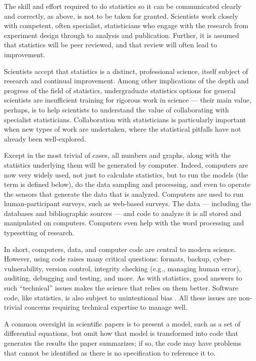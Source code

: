\documentclass{comjnl}
\begin{document}
The skill and effort required to do statistics so it can be communicated clearly and correctly, as above, is not to be taken for granted. Scientists work closely with competent, often specialist, statisticians who engage with the research from experiment design through to analysis and publication. Further, it is assumed that statistics will be peer reviewed, and that review will often lead to improvement. 

Scientists accept that statistics is a distinct, professional science, itself subject of research and continual improvement. Among other implications of the depth and progress of the field of statistics, undergraduate statistics options for general scientists are insufficient training for rigorous work in science --- their main value, perhaps, is to help scientists to understand the value of collaborating with specialist statisticians. Collaboration with statisticians is particularly important when new types of work are undertaken, where the statistical pitfalls have not already been well-explored.

Except in the most trivial of cases, all numbers and graphs, along with the statistics underlying them will be generated by computer. Indeed, computers are now very widely used, not just to calculate statistics, but to run the models (the term is defined below), do the data sampling and processing, and even to operate the sensors that generate the data that is analyzed. Computers are used to run human-participant surveys, such as web-based surveys. The data --- including the databases and bibliographic sources --- and code to analyze it is all stored and manipulated on computers. Computers even help with the word processing and typesetting of research.

In short, computers, data, and computer code are central to modern science. However, using code raises many critical questions: formats, backup, cyber-vulnerability, version control, integrity checking (e.g., managing human error), auditing, debugging and testing, and more. As with statistics, good answers to such ``technical'' issues makes the science that relies on them better. Software code, like statistics, is also subject to unintentional bias \cite{Ben,se-bias}.  All these issues are non-trivial concerns requiring technical expertise to manage well. 

A common oversight in scientific papers is to present a model, such as a set of differential equations, but omit how that model is transformed into code that generates the results the paper summarizes; if so, the code may have problems that cannot be identified as there is no specification to reference it to.
\end{document}
